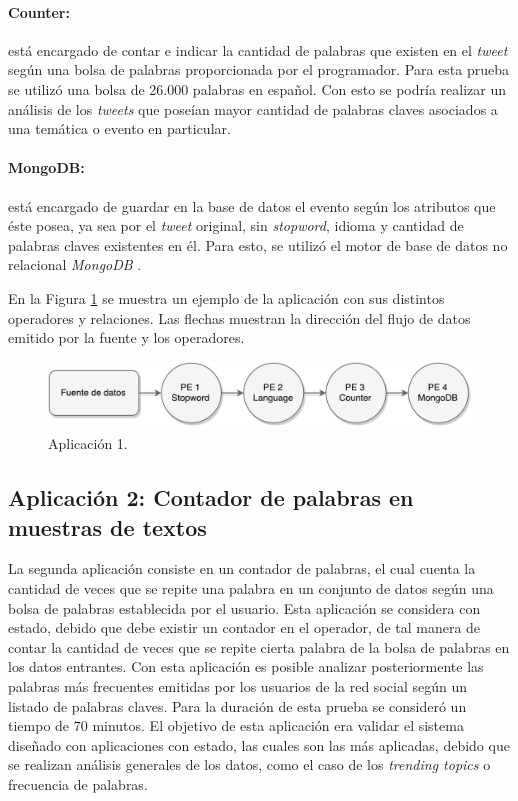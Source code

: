 \paragraph{Counter:} está encargado de contar e indicar la cantidad de palabras que existen en el \textit{tweet} según una bolsa de palabras proporcionada por el programador. Para esta prueba se utilizó una bolsa de 26.000 palabras en español. Con esto se podría realizar un análisis de los \textit{tweets} que poseían mayor cantidad de palabras claves asociados a una temática o evento en particular.

\paragraph{MongoDB:} está encargado de guardar en la base de datos el evento según los atributos que éste posea, ya sea por el \textit{tweet} original, sin \textit{stopword}, idioma y cantidad de palabras claves existentes en él. Para esto, se utilizó el motor de base de datos no relacional \textit{MongoDB} \citep{chodorow2013mongodb}.

En la Figura \ref{fig:primeraAplicacion} se muestra un ejemplo de la aplicación con sus distintos operadores y relaciones. Las flechas muestran la dirección del flujo de datos emitido por la fuente y los operadores.

\begin{figure}[!hb]
	\centering
		\includegraphics[scale=0.75]{images/App1.pdf}
	\caption{Aplicación 1.}
	\label{fig:primeraAplicacion}
\end{figure}

\subsection{Aplicación 2: Contador de palabras en muestras de textos}
La segunda aplicación consiste en un contador de palabras, el cual cuenta la cantidad de veces que se repite una palabra en un conjunto de datos según una bolsa de palabras establecida por el usuario. Esta aplicación se considera con estado, debido que debe existir un contador en el operador, de tal manera de contar la cantidad de veces que se repite cierta palabra de la bolsa de palabras en los datos entrantes. Con esta aplicación es posible analizar posteriormente las palabras más frecuentes emitidas por los usuarios de la red social según un listado de palabras claves. Para la duración de esta prueba se consideró un tiempo de 70 minutos. El objetivo de esta aplicación era validar el sistema diseñado con aplicaciones con estado, las cuales son las más aplicadas, debido que se realizan análisis generales de los datos, como el caso de los \textit{trending topics} o frecuencia de palabras.

